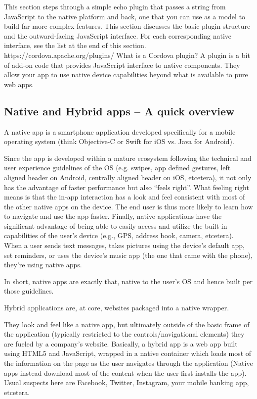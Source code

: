 This section steps through a simple echo plugin that passes a string from JavaScript to the native platform and back, one that you can use as a model to build far more complex features. This section discusses the basic plugin structure and the outward-facing JavaScript interface. For each corresponding native interface, see the list at the end of this section.
https://cordova.apache.org/plugins/
What is a Cordova plugin?
A plugin is a bit of add-on code that provides JavaScript interface to native components. They allow your app to use native device capabilities beyond what is available to pure web apps.
\subsection{Native and Hybrid apps – A quick overview}
A native app is a smartphone application developed specifically for a mobile operating system (think Objective-C or Swift for iOS vs. Java for Android).

Since the app is developed within a mature ecosystem following the technical and user experience guidelines of the OS (e.g. swipes, app defined gestures, left aligned header on Android, centrally aligned header on iOS, etcetera), it not only has the advantage of faster performance but also “feels right”. What feeling right means is that the in-app interaction has a look and feel consistent with most of the other native apps on the device. The end user is thus more likely to learn how to navigate and use the app faster. Finally, native applications have the significant advantage of being able to easily access and utilize the built-in capabilities of the user’s device (e.g., GPS, address book, camera, etcetera). When a user sends text messages, takes pictures using the device’s default app, set reminders, or uses the device’s music app (the one that came with the phone), they’re using native apps.

In short, native apps are exactly that, native to the user’s OS and hence built per those guidelines.

Hybrid applications are, at core, websites packaged into a native wrapper.

They look and feel like a native app, but ultimately outside of the basic frame of the application (typically restricted to the controls/navigational elements) they are fueled by a company’s website. Basically, a hybrid app is a web app built using HTML5 and JavaScript, wrapped in a native container which loads most of the information on the page as the user navigates through the application (Native apps instead download most of the content when the user first installs the app). Usual suspects here are Facebook, Twitter, Instagram, your mobile banking app, etcetera.
